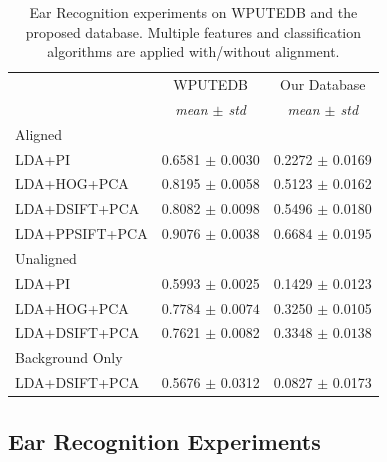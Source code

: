 \begin{table}[!t]
\centering
\begin{tabular}{|l|c|c|}
\hline
& WPUTEDB & Our Database\\
& \emph{mean $\pm$ std} & \emph{mean $\pm$ std} \\
\hline\hline
\multicolumn{3}{|l|}{Aligned}\\
\hline

LDA+PI              &  0.6581 $\pm$ 0.0030 &       0.2272 $\pm$ 0.0169 \\
LDA+HOG+PCA         &  0.8195 $\pm$ 0.0058 &       0.5123 $\pm$ 0.0162 \\
LDA+DSIFT+PCA       &  0.8082 $\pm$ 0.0098 &       0.5496 $\pm$ 0.0180\\
LDA+PPSIFT+PCA      &  $\bm{0.9076}$ $\pm$ $\bm{0.0038}$ &       $\bm{0.6684}$ $\pm$ $\bm{0.0195}$\\

\hline\hline
\multicolumn{3}{|l|}{Unaligned}\\
\hline

LDA+PI              &  0.5993 $\pm$ 0.0025 &       0.1429 $\pm$ 0.0123\\
LDA+HOG+PCA         &  $\bm{0.7784}$ $\pm$ $\bm{0.0074}$ &       0.3250 $\pm$ 0.0105\\
LDA+DSIFT+PCA       &  0.7621 $\pm$ 0.0082 &       $\bm{0.3348}$ $\pm$ $\bm{0.0138}$\\

\hline\hline
\multicolumn{3}{|l|}{Background Only}\\
\hline

LDA+DSIFT+PCA       &  0.5676 $\pm$ 0.0312 &       0.0827 $\pm$ 0.0173 \\
\hline
\end{tabular}
\caption{Ear Recognition experiments on WPUTEDB and the proposed database. Multiple features and classification algorithms are applied with/without alignment.}
\label{tab:ear_recognition}
\end{table}



\subsection{Ear Recognition Experiments}



